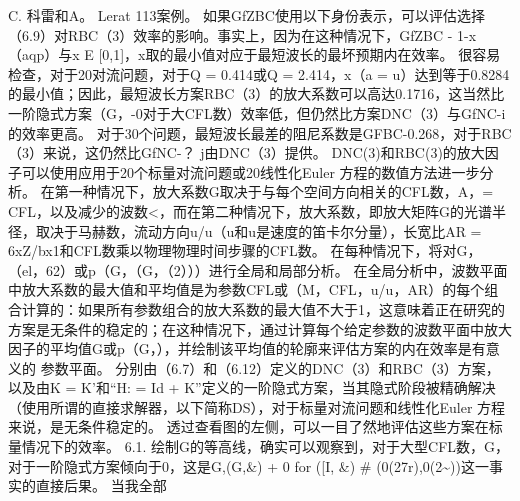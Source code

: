 \documentclass[UTF8,11pt,a4paper,openany,fontset=fandol]{ctexbook}
\begin{document}
C. 科雷和A。 Lerat 113案例。 如果GfZBC使用以下身份表示，可以评估选择（6.9）对RBC（3）效率的影响。事实上，因为在这种情况下，GfZBC - 1-x（aqp）与x E [0,1]，x取的最小值对应于最短波长的最坏预期内在效率。 很容易检查，对于20对流问题，对于Q = 0.414或Q = 2.414，x（a = u）达到等于0.8284的最小值；因此，最短波长方案RBC（3）的放大系数可以高达0.1716，这当然比一阶隐式方案（G，-0对于大CFL数）效率低，但仍然比方案DNC（3）与GfNC-i的效率更高。 对于30个问题，最短波长最差的阻尼系数是GFBC-0.268，对于RBC（3）来说，这仍然比GfNC-？ j由DNC（3）提供。 DNC(3)和RBC(3)的放大因子可以使用应用于20个标量对流问题或20线性化Euler 方程的数值方法进一步分析。 在第一种情况下，放大系数G取决于与每个空间方向相关的CFL数，A，= CFL，以及减少的波数<，而在第二种情况下，放大系数，即放大矩阵G的光谱半径，取决于马赫数，流动方向u/u（u和u是速度的笛卡尔分量），长宽比AR = 6xZ/bx1和CFL数乘以物理物理时间步骤的CFL数。 在每种情况下，将对G，（el，62）或p（G，（G，（2）））进行全局和局部分析。 在全局分析中，波数平面中放大系数的最大值和平均值是为参数CFL或（M，CFL，u/u，AR）的每个组合计算的：如果所有参数组合的放大系数的最大值不大于1，这意味着正在研究的方案是无条件的稳定的；在这种情况下，通过计算每个给定参数的波数平面中放大因子的平均值G或p（G，），并绘制该平均值的轮廓来评估方案的内在效率是有意义的 参数平面。 分别由（6.7）和（6.12）定义的DNC（3）和RBC（3）方案，以及由K = K'和“H: = Id + K”定义的一阶隐式方案，当其隐式阶段被精确解决（使用所谓的直接求解器，以下简称DS），对于标量对流问题和线性化Euler 方程来说，是无条件稳定的。 透过查看图的左侧，可以一目了然地评估这些方案在标量情况下的效率。 6.1. 绘制G的等高线，确实可以观察到，对于大型CFL数，G，对于一阶隐式方案倾向于0，这是G,(G,\&) + 0 for ([I, \&) \# (0(27r),0(2\textasciitilde{}))这一事实的直接后果。 当我全部
\end{document}
